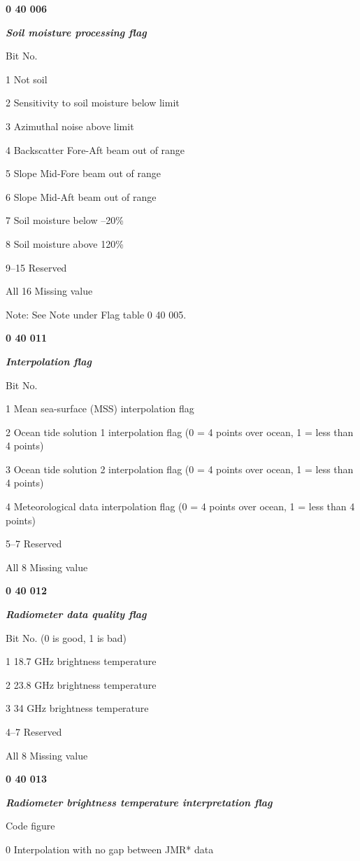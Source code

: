 \textbf{0 40 006}

\emph{\textbf{Soil moisture processing flag}}

Bit No.

1 Not soil

2 Sensitivity to soil moisture below limit

3 Azimuthal noise above limit

4 Backscatter Fore-Aft beam out of range

5 Slope Mid-Fore beam out of range

6 Slope Mid-Aft beam out of range

7 Soil moisture below --20\%

8 Soil moisture above 120\%

9--15 Reserved

All 16 Missing value

Note: See Note under Flag table 0 40 005.

\textbf{0 40 011}

\emph{\textbf{Interpolation flag}}

Bit No.

1 Mean sea-surface (MSS) interpolation flag

2 Ocean tide solution 1 interpolation flag (0 = 4 points over ocean, 1 = less than 4 points)

3 Ocean tide solution 2 interpolation flag (0 = 4 points over ocean, 1 = less than 4 points)

4 Meteorological data interpolation flag (0 = 4 points over ocean, 1 = less than 4 points)

5--7 Reserved

All 8 Missing value

\textbf{0 40 012}

\emph{\textbf{Radiometer data quality flag}}

Bit No. (0 is good, 1 is bad)

1 18.7 GHz brightness temperature

2 23.8 GHz brightness temperature

3 34 GHz brightness temperature

4--7 Reserved

All 8 Missing value

\textbf{0 40 013}

\emph{\textbf{Radiometer brightness temperature interpretation flag}}

Code figure

0 Interpolation with no gap between JMR* data

